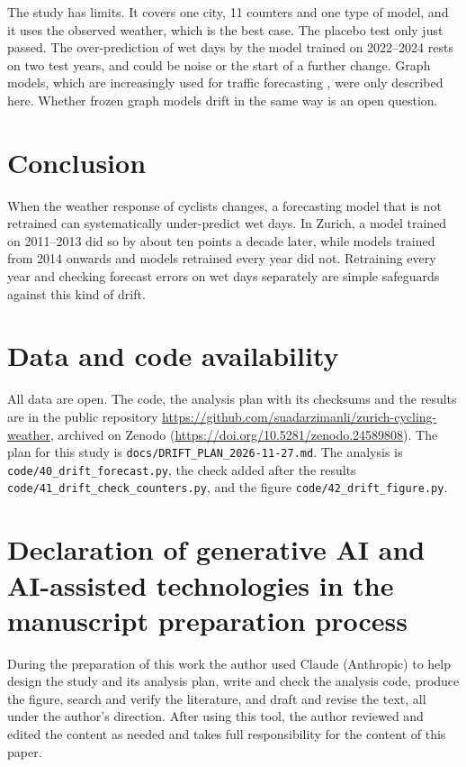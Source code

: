 \documentclass[preprint,12pt,authoryear]{elsarticle}
\begin{document}
The study has limits. It covers one city, 11 counters and one type of model, and it uses the observed weather, which is the best case. The placebo test only just passed. The over-prediction of wet days by the model trained on 2022--2024 rests on two test years, and could be noise or the start of a further change. Graph models, which are increasingly used for traffic forecasting \citep{cini2025graph}, were only described here. Whether frozen graph models drift in the same way is an open question.

\section{Conclusion}

When the weather response of cyclists changes, a forecasting model that is not retrained can systematically under-predict wet days. In Zurich, a model trained on 2011--2013 did so by about ten points a decade later, while models trained from 2014 onwards and models retrained every year did not. Retraining every year and checking forecast errors on wet days separately are simple safeguards against this kind of drift.

\section*{Data and code availability}

All data are open. The code, the analysis plan with its checksums and the results are in the public repository \url{https://github.com/suadarzimanli/zurich-cycling-weather}, archived on Zenodo (\url{https://doi.org/10.5281/zenodo.24589808}). The plan for this study is \nolinkurl{docs/DRIFT_PLAN_2026-11-27.md}. The analysis is \nolinkurl{code/40_drift_forecast.py}, the check added after the results \nolinkurl{code/41_drift_check_counters.py}, and the figure \nolinkurl{code/42_drift_figure.py}.

\section*{Declaration of generative AI and AI-assisted technologies in the\\manuscript preparation process}

During the preparation of this work the author used Claude (Anthropic) to help design the study and its analysis plan, write and check the analysis code, produce the figure, search and verify the literature, and draft and revise the text, all under the author's direction. After using this tool, the author reviewed and edited the content as needed and takes full responsibility for the content of this paper.
\end{document}

